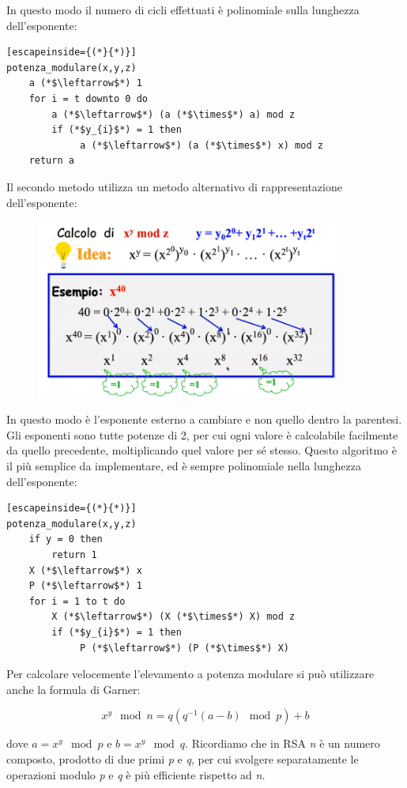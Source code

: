 In questo modo il numero di cicli effettuati è polinomiale sulla lunghezza dell'esponente:
\begin{lstlisting}[escapeinside={(*}{*)}]
potenza_modulare(x,y,z)
    a (*$\leftarrow$*) 1
    for i = t downto 0 do
        a (*$\leftarrow$*) (a (*$\times$*) a) mod z
        if (*$y_{i}$*) = 1 then
             a (*$\leftarrow$*) (a (*$\times$*) x) mod z
    return a
\end{lstlisting}

Il secondo metodo utilizza un metodo alternativo di rappresentazione dell'esponente:

\begin{figure}[htb!]
    \centering
    \includegraphics[width=10cm]{./Images/cap1/1.46.png}
\end{figure} 

In questo modo è l'esponente esterno a cambiare e non quello dentro la parentesi. Gli esponenti sono tutte potenze di 2, per cui ogni valore è calcolabile facilmente da quello precedente, moltiplicando quel valore per sé stesso. Questo algoritmo è il più semplice da implementare, ed è sempre polinomiale nella lunghezza dell'esponente:
\begin{lstlisting}[escapeinside={(*}{*)}]
potenza_modulare(x,y,z)
    if y = 0 then
        return 1
    X (*$\leftarrow$*) x
    P (*$\leftarrow$*) 1
    for i = 1 to t do
        X (*$\leftarrow$*) (X (*$\times$*) X) mod z
        if (*$y_{i}$*) = 1 then
             P (*$\leftarrow$*) (P (*$\times$*) X) 
\end{lstlisting}
Per calcolare velocemente l'elevamento a potenza modulare si può utilizzare anche la formula di Garner:

\[ x^{y} \mod n = q (q^{-1} (a-b) \mod p) + b\]

dove $a = x^{y} \mod p$ e $b = x^{y} \mod q$. Ricordiamo che in RSA \textit{n} è un numero composto, prodotto di due primi \textit{p} e \textit{q}, per cui svolgere separatamente le operazioni modulo \textit{p} e \textit{q} è più efficiente rispetto ad \textit{n}.

